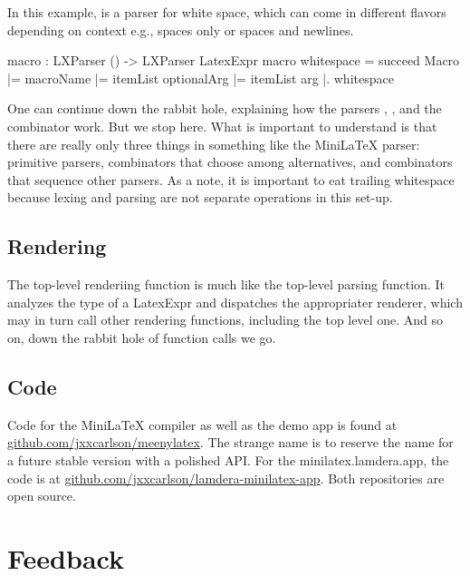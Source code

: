 In this example,  is a parser for white space, which can come in different flavors depending on context e.g., spaces only or spaces and newlines.

\begin{listing}
macro : LXParser () -> LXParser LatexExpr
macro whitespace =
    succeed Macro
        |= macroName
        |= itemList optionalArg
        |= itemList arg
        |. whitespace
\end{listing}

One can continue down the rabbit hole, explaining how the parsers , ,   and the combinator  work.  But we stop here.  What is important to understand is that there are really only three things in something like the MiniLaTeX parser: primitive parsers, combinators that choose among alternatives, and combinators that sequence other parsers. As a note, it is important to eat trailing whitespace because lexing and parsing are not separate operations in this set-up.

\subsection{Rendering}


The top-level renderiing function is much like the top-level parsing function. It analyzes the type of a LatexExpr and dispatches the appropriater renderer, which may in turn call other rendering functions, including the top level one. And so on, down the rabbit hole of function calls we go.


\subsection{Code}

Code for the MiniLaTeX compiler as well as the demo app is found at \href{https://github.com/jxxcarlson/meenylatex}{github.com/jxxcarlson/meenylatex}.  The strange name is to reserve the name  for a future stable version with a polished API.   For the minilatex.lamdera.app, the code is at \href{https://github.com/jxxcarlson/lamdera-minilatex-app}{github.com/jxxcarlson/lamdera-minilatex-app}.
Both repositories are open source. 

\section{Feedback}

